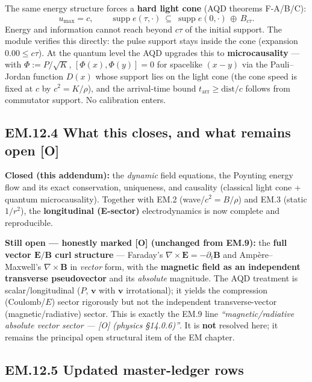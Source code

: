 \documentclass[
  10pt,
]{article}
\begin{document}
The same energy structure forces a \textbf{hard light cone} (AQD
theorems F-A/B/C): \[
u_{\max}=c,\qquad \operatorname{supp} e(\tau,\cdot)\ \subseteq\ \operatorname{supp} e(0,\cdot)\,\oplus\,B_{c\tau}.
\] Energy and information cannot reach beyond \(c\tau\) of the initial
support. The module verifies this directly: the pulse support stays
inside the cone (expansion \(0.00 \le c\tau\)). At the quantum level the
AQD upgrades this to \textbf{microcausality} --- with
\(\Phi:=P/\sqrt K\), \([\Phi(x),\Phi(y)]=0\) for spacelike \((x-y)\) via
the Pauli--Jordan function \(D(x)\) whose support lies on the light cone
(the cone speed is fixed at \(c\) by \(c^2=K/\rho\)), and the
arrival-time bound \(t_{\text{arr}}\ge \text{dist}/c\) follows from
commutator support. No calibration enters.

\hypertarget{em.12.4-what-this-closes-and-what-remains-open-o}{%
\subsection{\texorpdfstring{EM.12.4 What this closes, and what remains
open
\textbf{{[}O{]}}}{EM.12.4 What this closes, and what remains open {[}O{]}}}\label{em.12.4-what-this-closes-and-what-remains-open-o}}

\textbf{Closed (this addendum):} the \emph{dynamic} field equations, the
Poynting energy flow and its exact conservation, uniqueness, and
causality (classical light cone + quantum microcausality). Together with
EM.2 (wave/\(c^2=B/\rho\)) and EM.3 (static \(1/r^2\)), the
\textbf{longitudinal (E-sector)} electrodynamics is now complete and
reproducible.

\textbf{Still open --- honestly marked {[}O{]} (unchanged from EM.9):}
the \textbf{full vector \(\mathbf E/\mathbf B\) curl structure} ---
Faraday's \(\nabla\times\mathbf E=-\partial_t\mathbf B\) and
Ampère--Maxwell's \(\nabla\times\mathbf B\) in \emph{vector} form, with
the \textbf{magnetic field as an independent transverse pseudovector}
and its \emph{absolute} magnitude. The AQD treatment is
scalar/longitudinal (\(P\), \(\mathbf v\) with \(\mathbf v\)
irrotational); it yields the compression (Coulomb/\(E\)) sector
rigorously but not the independent transverse-vector
(magnetic/radiative) sector. This is exactly the EM.9 line
\emph{``magnetic/radiative absolute vector sector --- {[}O{]} (physics
§14.0.6)''}. It is \textbf{not} resolved here; it remains the principal
open structural item of the EM chapter.

\hypertarget{em.12.5-updated-master-ledger-rows}{%
\subsection{EM.12.5 Updated master-ledger
rows}\label{em.12.5-updated-master-ledger-rows}}
\end{document}
